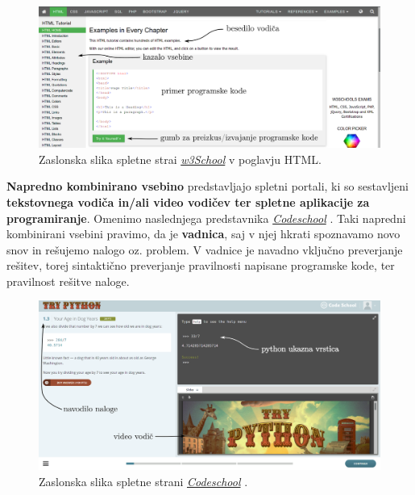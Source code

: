 \begin{figure}[h!]
    \includegraphics [width=1\linewidth, keepaspectratio =
    1] {./images/sc_web/w3school.png}
    \caption{Zaslonska slika spletne strai
      \emph{\href{http://www.w3schools.com/}{w3School}}
      \cite{web:w3school} v poglavju HTML.}
    \label{fig:scr:web:w3school}
\end{figure}

\textbf{Napredno kombinirano vsebino} predstavljajo spletni portali, ki so
sestavljeni \textbf{tekstovnega vodiča in/ali video vodičev ter
  spletne aplikacije za programiranje}. Omenimo naslednjega
predstavnika \emph{\href{https://www.codeschool.com/}{Codeschool}}
\cite{web:codeschool}. Taki napredni kombinirani vsebini pravimo, da
je \textbf{vadnica}, saj v njej hkrati spoznavamo novo snov in
rešujemo nalogo oz. problem. V vadnice je navadno vključno preverjanje
rešitev, torej sintaktično preverjanje pravilnosti napisane programske
kode, ter pravilnost rešitve naloge. 

\begin{figure}[h!]
    \includegraphics [width=1\linewidth, keepaspectratio =
    1] {./images/sc_web/codeschool_01.png}
    \caption{Zaslonska slika spletne strani
      \emph{\href{https://www.codeschool.com/}{Codeschool}}
      \cite{web:codeschool}.}
    \label{fig:scr:web:codeschool}
\end{figure}

